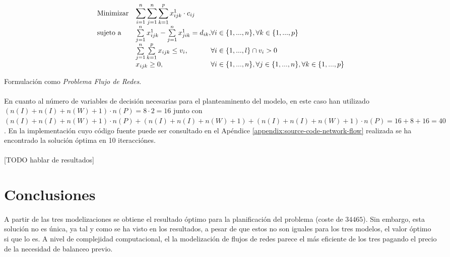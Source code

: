 \documentclass{article}
\begin{document}
    \begin{eqfloat}
      \begin{equation}
        \begin{array}{ll@{}ll}
          \text{Minimizar}	& \displaystyle \sum\limits_{i=1}^{n}\sum\limits_{j=1}^{n}\sum\limits_{k=1}^{p} x^{1}_{ijk} \cdot c_{ij} \\
          \text{sujeto a}		& \sum\limits_{j=1}^{n} x^{1}_{ijk} - \sum\limits_{j=1}^{n} x^{1}_{jik} = d_{ik}, & \forall i \in \{1,...,n\}, \forall k \in \{1,...,p\}\\
                            &	\sum\limits_{j=1}^{n}\sum\limits_{k=1}^{p}  x_{ijk}	\leq v_{i}, 		  & \forall i \in \{1,...,l\} \cap v_{i} > 0\\
                            & x_{ijk}	\geq 0, 	& \forall i \in \{1,...,n\}, \forall j \in \{1,...,n\}, \forall k \in \{1,...,p\}
        \end{array}
      \end{equation}
      \caption{Formulación como \emph{Problema Flujo de Redes}.}
      \label{eq:network-flow-model}
    \end{eqfloat}

    \paragraph{}
    En cuanto al número de variables de decisión necesarias para el planteaminento del modelo, en este caso han utilizado $ (n(I) + n(I) + n(W) + 1) \cdot n(P) = 8 \cdot 2 = 16$ junto con $(n(I) + n(I) + n(W) + 1) \cdot n(P) + (n(I) + n(I) + n(W) + 1) + (n(I) + n(I) + n(W) + 1) \cdot n(P) = 16 + 8 + 16 = 40$. En la implementación cuyo código fuente puede ser consultado en el Apéndice \ref{appendix:source-code-network-flow} realizada se ha encontrado la solución óptima en 10 iteracciónes.

    \paragraph{}
    [TODO hablar de resultados]


  \section{Conclusiones}
  \label{section:conclusions}

    \paragraph{}
    A partir de las tres modelizaciones se obtiene el resultado óptimo para la planificación del problema (coste de \textbf{$34465$}). Sin embargo, esta solución no es única, ya tal y como se ha visto en los resultados, a pesar de que estos no son iguales para los tres modelos, el valor óptimo si que lo es. A nivel de complejidad computacional, el la modelización de flujos de redes parece el más eficiente de los tres pagando el precio de la necesidad de balanceo previo.
\end{document}
